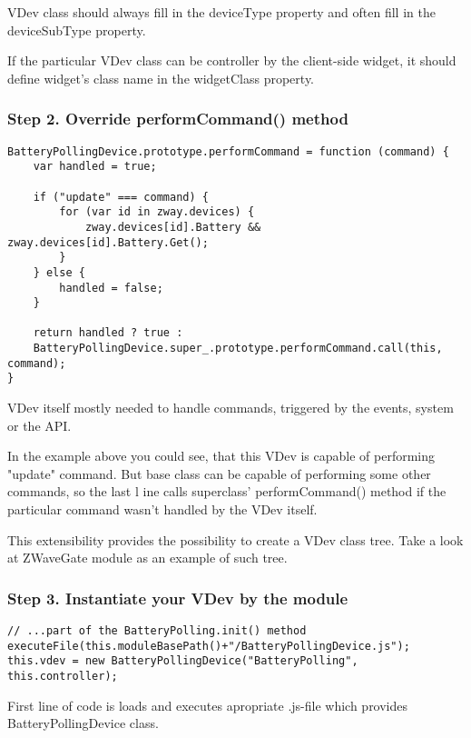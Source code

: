 VDev class should always fill in the deviceType property and often fill in the 
deviceSubType property.

If the particular VDev class can be controller by the client-side widget, it should define 
widget's class name in the widgetClass property.

\subsubsection{Step 2. Override performCommand() method}

\begin{lstlisting}[basicstyle=\small,columns=fullflexible]
BatteryPollingDevice.prototype.performCommand = function (command) {
    var handled = true;

    if ("update" === command) {
        for (var id in zway.devices) {
            zway.devices[id].Battery && zway.devices[id].Battery.Get();
        }
    } else {
        handled = false;
    }

    return handled ? true : 
    BatteryPollingDevice.super_.prototype.performCommand.call(this, command);
}
\end{lstlisting}


VDev itself mostly needed to handle commands, triggered by the events, system or the API.

In the example above you could see, that this VDev is capable of performing "update" 
command. But base class can be capable of performing some other commands, so the last l
ine calls superclass' performCommand() method if the particular command wasn't handled 
by the VDev itself.

This extensibility provides the possibility to create a VDev class tree. Take a look at 
ZWaveGate module as an example of such tree.

\subsubsection{Step 3. Instantiate your VDev by the module}

\begin{lstlisting}[basicstyle=\small,columns=fullflexible]
// ...part of the BatteryPolling.init() method
executeFile(this.moduleBasePath()+"/BatteryPollingDevice.js");
this.vdev = new BatteryPollingDevice("BatteryPolling", this.controller);
\end{lstlisting}

First line of code is loads and executes apropriate .js-file which provides 
BatteryPollingDevice class.

